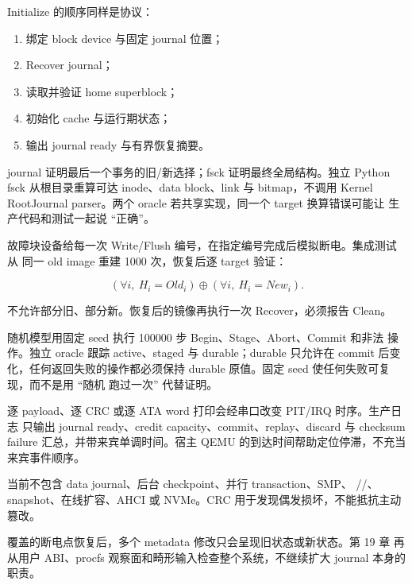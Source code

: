 Initialize 的顺序同样是协议：

\begin{enumerate}
  \item 绑定 block device 与固定 journal 位置；
  \item Recover journal；
  \item 读取并验证 home superblock；
  \item 初始化 cache 与运行期状态；
  \item 输出 journal ready 与有界恢复摘要。
\end{enumerate}

journal 证明最后一个事务的旧/新选择；fsck 证明最终全局结构。独立 Python
fsck 从根目录重算可达 inode、data block、link 与 bitmap，不调用 Kernel
RootJournal parser。两个 oracle 若共享实现，同一个 target 换算错误可能让
生产代码和测试一起说 ``正确''。

故障块设备给每一次 Write/Flush 编号，在指定编号完成后模拟断电。集成测试从
同一 old image 重建 1000 次，恢复后逐 target 验证：

\[
(\forall i,\ H_i=Old_i)
\oplus
(\forall i,\ H_i=New_i).
\]

不允许部分旧、部分新。恢复后的镜像再执行一次 Recover，必须报告 Clean。

随机模型用固定 seed 执行 100000 步 Begin、Stage、Abort、Commit 和非法
操作。独立 oracle 跟踪 active、staged 与 durable；durable 只允许在 commit
后变化，任何返回失败的操作都必须保持 durable 原值。固定 seed 使任何失败可复现，而不是用 ``随机
跑过一次'' 代替证明。

逐 payload、逐 CRC 或逐 ATA word 打印会经串口改变 PIT/IRQ 时序。生产日志
只输出 journal ready、credit capacity、commit、replay、discard 与 checksum
failure 汇总，并带来宾单调时间。宿主 QEMU 的到达时间帮助定位停滞，不充当
来宾事件顺序。

当前不包含 data journal、后台 checkpoint、并行 transaction、SMP、
//、snapshot、在线扩容、AHCI 或
NVMe。CRC 用于发现偶发损坏，不能抵抗主动篡改。

覆盖的断电点恢复后，多个 metadata 修改只会呈现旧状态或新状态。第 19 章
再从用户 ABI、procfs 观察面和畸形输入检查整个系统，不继续扩大 journal
本身的职责。
